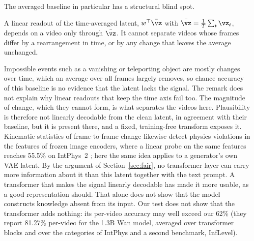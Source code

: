 The averaged baseline in particular has a structural blind spot.
\begin{remark}\label{rem:average}
A linear readout of the time-averaged latent, $w^\top \bar\vz$ with $\bar\vz = \frac1T \sum_t \vz_t$, depends on a video only through $\bar\vz$. It cannot separate videos whose frames differ by a rearrangement in time, or by any change that leaves the average unchanged.
\end{remark}
Impossible events such as a vanishing or teleporting object are mostly changes over time, which an average over all frames largely removes, so chance accuracy of this baseline is no evidence that the latent lacks the signal. The remark does not explain why linear readouts that keep the time axis fail too. The magnitude of change, which they cannot form, is what separates the videos here. Plausibility is therefore not linearly decodable from the clean latent, in agreement with their baseline, but it is present there, and a fixed, training-free transform exposes it. Kinematic statistics of frame-to-frame change likewise detect physics violations in the features of frozen image encoders, where a linear probe on the same features reaches 55.5\% on IntPhys~2 \citep{interno2026geophys}; here the same idea applies to a generator's own VAE latent. By the argument of Section~\ref{sec:fair}, no transformer layer can carry more information about it than this latent together with the text prompt. A transformer that makes the signal linearly decodable has made it more usable, as a good representation should. That alone does not show that the model constructs knowledge absent from its input. Our test does not show that the transformer adds nothing: its per-video accuracy may well exceed our 62\% (they report 81.27\% per-video for the 1.3B Wan model, averaged over transformer blocks and over the categories of IntPhys and a second benchmark, InfLevel).
